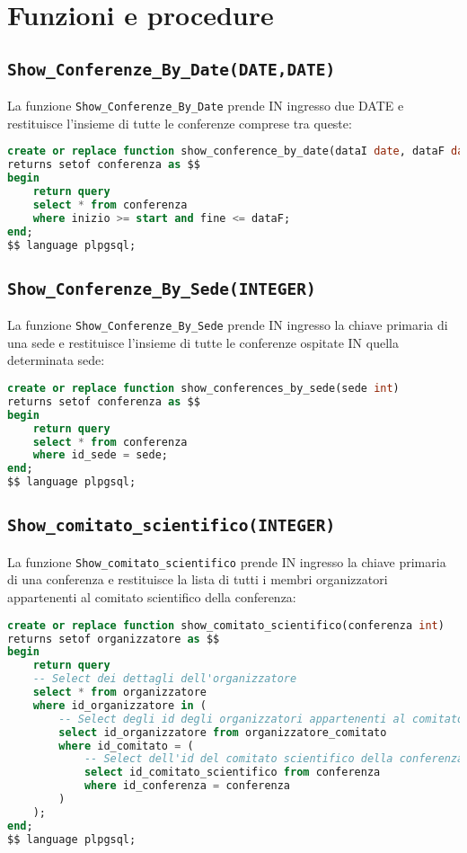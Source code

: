 \section{Funzioni e procedure}
\subsection{\texttt{Show\_Conferenze\_By\_Date(DATE,DATE)}}
La funzione \texttt{Show\_Conferenze\_By\_Date} prende IN ingresso due DATE e restituisce l'insieme di tutte le conferenze comprese tra queste:
\begin{lstlisting}[language=SQL, style=mystyle]
create or replace function show_conference_by_date(dataI date, dataF date)
returns setof conferenza as $$
begin
    return query
    select * from conferenza
    where inizio >= start and fine <= dataF;
end;
$$ language plpgsql;
\end{lstlisting}
\subsection{\texttt{Show\_Conferenze\_By\_Sede(INTEGER)}}
La funzione \texttt{Show\_Conferenze\_By\_Sede} prende IN ingresso la chiave primaria di una sede e restituisce l'insieme di tutte le conferenze ospitate IN quella determinata sede:
\begin{lstlisting}[language=SQL, style=mystyle]
create or replace function show_conferences_by_sede(sede int)
returns setof conferenza as $$
begin
    return query
    select * from conferenza
    where id_sede = sede;
end;
$$ language plpgsql;
\end{lstlisting}
\subsection{\texttt{Show\_comitato\_scientifico(INTEGER)}}
La funzione \texttt{Show\_comitato\_scientifico} prende IN ingresso la chiave primaria di una conferenza e restituisce la lista di tutti i membri organizzatori appartenenti al comitato scientifico della conferenza:
\begin{lstlisting}[language=SQL, style=mystyle]
create or replace function show_comitato_scientifico(conferenza int)
returns setof organizzatore as $$
begin
    return query
    -- Select dei dettagli dell'organizzatore
    select * from organizzatore
    where id_organizzatore in (
        -- Select degli id degli organizzatori appartenenti al comitato scientifico
        select id_organizzatore from organizzatore_comitato
        where id_comitato = (
            -- Select dell'id del comitato scientifico della conferenza
            select id_comitato_scientifico from conferenza
            where id_conferenza = conferenza
        )
    );
end;
$$ language plpgsql;
\end{lstlisting}

